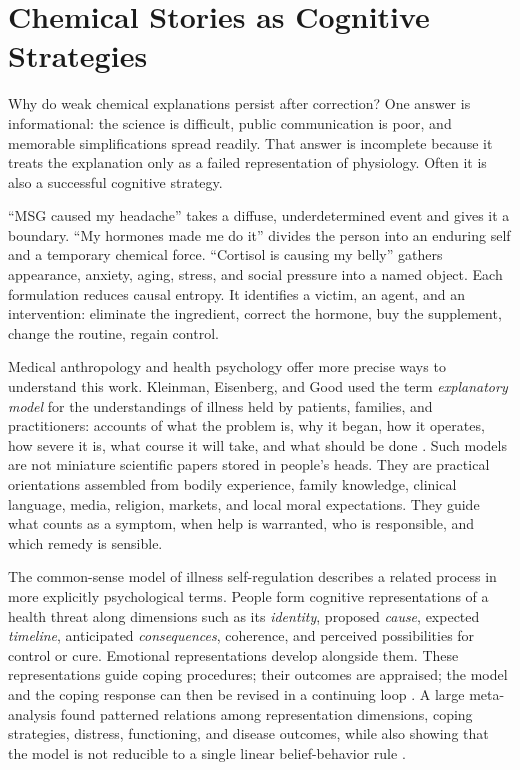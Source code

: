 \documentclass[11pt]{article}
\begin{document}
\section{Chemical Stories as Cognitive Strategies}

Why do weak chemical explanations persist after correction? One answer is informational: the science is difficult, public communication is poor, and memorable simplifications spread readily. That answer is incomplete because it treats the explanation only as a failed representation of physiology. Often it is also a successful cognitive strategy.

``MSG caused my headache'' takes a diffuse, underdetermined event and gives it a boundary. ``My hormones made me do it'' divides the person into an enduring self and a temporary chemical force. ``Cortisol is causing my belly'' gathers appearance, anxiety, aging, stress, and social pressure into a named object. Each formulation reduces causal entropy. It identifies a victim, an agent, and an intervention: eliminate the ingredient, correct the hormone, buy the supplement, change the routine, regain control.

Medical anthropology and health psychology offer more precise ways to understand this work. Kleinman, Eisenberg, and Good used the term \emph{explanatory model} for the understandings of illness held by patients, families, and practitioners: accounts of what the problem is, why it began, how it operates, how severe it is, what course it will take, and what should be done \citep{kleinman1978culture}. Such models are not miniature scientific papers stored in people's heads. They are practical orientations assembled from bodily experience, family knowledge, clinical language, media, religion, markets, and local moral expectations. They guide what counts as a symptom, when help is warranted, who is responsible, and which remedy is sensible.

The common-sense model of illness self-regulation describes a related process in more explicitly psychological terms. People form cognitive representations of a health threat along dimensions such as its \emph{identity}, proposed \emph{cause}, expected \emph{timeline}, anticipated \emph{consequences}, coherence, and perceived possibilities for control or cure. Emotional representations develop alongside them. These representations guide coping procedures; their outcomes are appraised; the model and the coping response can then be revised in a continuing loop \citep{leventhal1980common,hagger2017commonsense,hagger2022conceptual}. A large meta-analysis found patterned relations among representation dimensions, coping strategies, distress, functioning, and disease outcomes, while also showing that the model is not reducible to a single linear belief-behavior rule \citep{hagger2017commonsense}.
\end{document}
